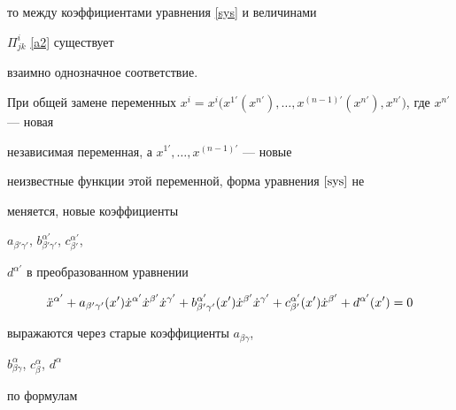 то между коэффициентами уравнения \eqref{sys} и величинами


$\Pi^{i}_{jk}$ \eqref{a2} существует


взаимно однозначное соответствие.





При общей замене переменных $x^{i}=x^{i}\big(x^{1'}(x^{n'}),


\dotsc,x^{(n-1)'}(x^{n'}),x^{n'}\big)$, где $x^{n'}$ --- новая


независимая переменная, а $x^{1'},\ldots,x^{(n-1) '}$ --- новые


неизвестные функции этой переменной, форма уравнения $\eqref{sys}$ не


меняется, новые коэффициенты


$a_{\beta'\gamma'}$, $b^{\alpha'}_{\beta'\gamma'}$, $c^{\alpha'}_{\beta'}$,


$d^{\alpha'}$ в преобразованном уравнении


\begin{equation}\label{a10}


\Ddot{x}^{\alpha'}+a_{\beta'\gamma'}(x')\Dot{x}^{\alpha'}\Dot{x}^{\beta'}


\Dot{x}^{\gamma'}


+b^{\alpha'}_{\beta'\gamma'}(x')\Dot{x}^{\beta'}\Dot{x}^{\gamma'}


+c^{\alpha'}_{\beta'}(x')\Dot{x}^{\beta'}+d^{\alpha'}(x')=0


\end{equation}


выражаются через старые коэффициенты $a_{\beta\gamma}$,


$b^{\alpha}_{\beta\gamma}$, $c^{\alpha}_{\beta}$, $d^{\alpha}$


по формулам


